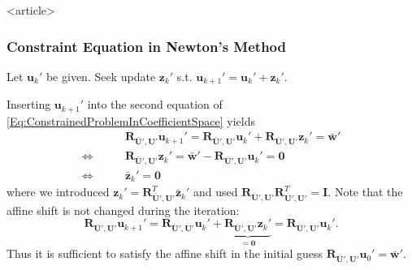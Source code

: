 \begin{frame}<article>
\frametitle<presentation>{Constraint Equation in Newton's Method}
Let $\mathbf{u}_{k}'$ be given.  Seek update $\mathbf{z}_{k}'$ s.t.
$\mathbf{u}_{k+1}' = \mathbf{u}_{k}' + \mathbf{z}_{k}'$. 

Inserting $\mathbf{u}_{k+1}'$ into the second equation of
\eqref{Eq:ConstrainedProblemInCoefficientSpace} yields
\begin{equation}\label{Eq:SideCond}
\begin{split}
& \mathbf{R}_{\bar{\mathbf{U}}',\mathbf{U}'} \mathbf{u}_{k+1}'
= \mathbf{R}_{\bar{\mathbf{U}}',\mathbf{U}'} \mathbf{u}_{k}' +
\mathbf{R}_{\bar{\mathbf{U}}',\mathbf{U}'} \mathbf{z}_{k}'
 =  \bar{\mathbf{w}}'\\ 
\Leftrightarrow\qquad &
\mathbf{R}_{\bar{\mathbf{U}}',\mathbf{U}'} \mathbf{z}_{k}' = 
\bar{\mathbf{w}}' - \mathbf{R}_{\bar{\mathbf{U}}',\mathbf{U}'}
\mathbf{u}_{k}' = \mathbf{0}\\
\Leftrightarrow\qquad &
\bar{\mathbf{z}}_{k}' = \mathbf{0}
\end{split}
\end{equation}
where we introduced $\mathbf{z}_{k}' =
\mathbf{R}^T_{\bar{\mathbf{U}}',\mathbf{U}'}
\bar{\mathbf{z}}_{k}'$ and used $\mathbf{R}_{\bar{\mathbf{U}}',\mathbf{U}'}
\mathbf{R}^T_{\bar{\mathbf{U}}',\mathbf{U}'}=\mathbf{I}$. 
Note that the affine shift is not changed during the iteration:
\begin{equation}
\mathbf{R}_{\bar{\mathbf{U}}',\mathbf{U}'}\mathbf{u}_{k+1}' =
\mathbf{R}_{\bar{\mathbf{U}}',\mathbf{U}'} \mathbf{u}_{k}' +
\underbrace{\mathbf{R}_{\bar{\mathbf{U}}',\mathbf{U}'}
  \mathbf{z}_{k}'}_{= \mathbf{0}} =
\mathbf{R}_{\bar{\mathbf{U}}',\mathbf{U}'} \mathbf{u}_{k}' .
\end{equation}
Thus it is sufficient to satisfy the affine shift in the initial
guess $\mathbf{R}_{\bar{\mathbf{U}}',\mathbf{U}'} \mathbf{u}_{0}' =
\bar{\mathbf{w}}'$.
\end{frame}

